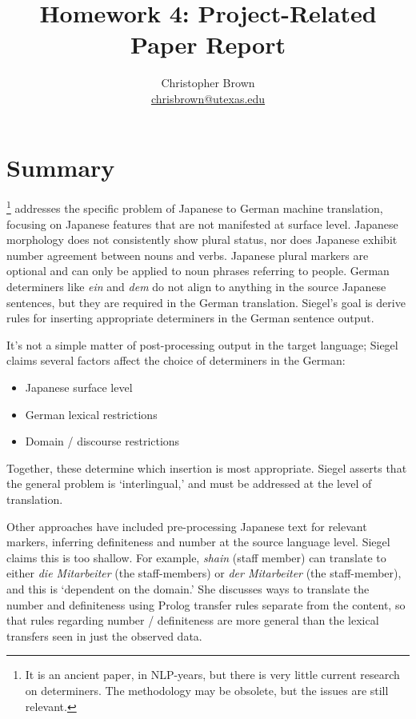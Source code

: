 \documentclass[11pt]{article}
\title{Homework 4: Project-Related Paper Report}
\author{Christopher Brown\smallskip\\\href{mailto:chrisbrown@utexas.edu}{chrisbrown@utexas.edu}}
\begin{document}
\maketitle


\setlength{\topsep}{0pt}
\section{Summary}

\citet{siegel:1996}\footnote{It is an ancient paper, in NLP-years, but there is very little current research on determiners. The methodology may be obsolete, but the issues are still relevant.} addresses the specific problem of Japanese to German machine translation, focusing on Japanese features that are not manifested at surface level. Japanese morphology does not consistently show plural status, nor does Japanese exhibit number agreement between nouns and verbs. Japanese plural markers are optional and can only be applied to noun phrases referring to people.
German determiners like \emph{ein} and \emph{dem} do not align to anything in the source Japanese sentences, but they are required in the German translation. Siegel's goal is derive rules for inserting appropriate determiners in the German sentence output.

It's not a simple matter of post-processing output in the target language; Siegel claims several factors affect the choice of determiners in the German:
\begin{itemize}[itemsep=0pt,topsep=6pt]
  \item Japanese surface level
  \item German lexical restrictions
  \item Domain / discourse restrictions
\end{itemize}
Together, these determine which insertion is most appropriate. Siegel asserts that the general problem is `interlingual,' and must be addressed at the level of translation.

Other approaches have included pre-processing Japanese text for relevant markers, inferring definiteness and number at the source language level.
Siegel claims this is too shallow. For example, \emph{shain} (staff member) can translate to either \emph{die Mitarbeiter} (the staff-members) or \emph{der Mitarbeiter} (the staff-member), and this is `dependent on the domain.'
She discusses ways to translate the number and definiteness using Prolog transfer rules separate from the content, so that rules regarding number / definiteness are more general than the lexical transfers seen in just the observed data.
\end{document}
